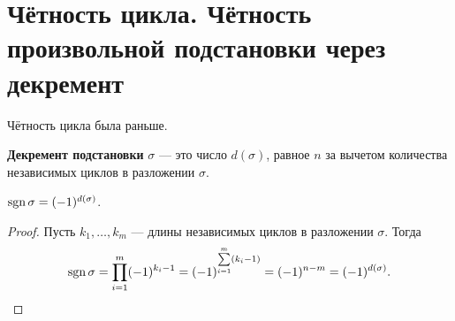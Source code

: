 \section{Чётность цикла. Чётность произвольной подстановки через декремент}

Чётность цикла была раньше.

\begin{definition}
    \textbf{Декремент подстановки} $\sigma$ --- это число $d(\sigma)$, равное $n$ за вычетом количества независимых циклов в разложении $\sigma$.
\end{definition}

\begin{theorem}
    $\mathrm{sgn}\,\sigma = (-1)^{d(\sigma)}$.
\end{theorem}

\begin{proof}
    Пусть $k_1, \ldots, k_m$ --- длины независимых циклов в разложении $\sigma$. Тогда
    $$
    \mathrm{sgn}\,\sigma = \prod_{i = 1}^m(-1)^{k_i - 1} = (-1)^{\sum\limits_{i = 1}^m(k_i - 1)} = (-1)^{n - m} = (-1)^{d(\sigma)}.
    $$
\end{proof}


